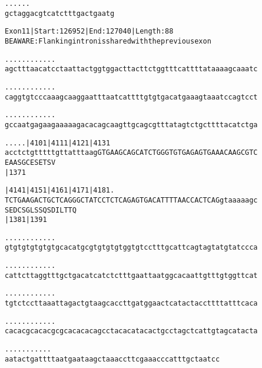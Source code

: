 \documentclass{article}
\begin{document}
\newpage
\begin{alltt}
.    .    .    .    .    .
gctaggacgtcatctttgactgaatg
\end{alltt}
\newpage
\begin{alltt}
Exon 11 | Start: 126952 | End: 127040 | Length: 88
BE AWARE: Flanking intron is shared with the previous exon

.    .    .    .    .    .    .    .    .    .    .    .    
agctttaacatcctaattactggtggacttacttctggtttcattttataaaagcaaatc

.    .    .    .    .    .    .    .    .    .    .    .    
caggtgtcccaaagcaaggaatttaatcattttgtgtgacatgaaagtaaatccagtcct

.    .    .    .    .    .    .    .    .    .    .    .    
gccaatgagaagaaaaagacacagcaagttgcagcgtttatagtctgcttttacatctga

.    .    .    .    .     |4101     |4111     |4121     |4131
acctctgtttttgttatttaagGTGAAGCAGCATCTGGGTGTGAGAGTGAAACAAGCGTC
                        E  A  A  S  G  C  E  S  E  T  S  V  
                                    |1371                   

      |4141     |4151     |4161     |4171     |4181    .    
TCTGAAGACTGCTCAGGGCTATCCTCTCAGAGTGACATTTTAACCACTCAGgtaaaaagc
S  E  D  C  S  G  L  S  S  Q  S  D  I  L  T  T  Q           
      |1381                         |1391                   

.    .    .    .    .    .    .    .    .    .    .    .    
gtgtgtgtgtgtgcacatgcgtgtgtgtggtgtcctttgcattcagtagtatgtatccca

.    .    .    .    .    .    .    .    .    .    .    .    
cattcttaggtttgctgacatcatctctttgaattaatggcacaattgtttgtggttcat

.    .    .    .    .    .    .    .    .    .    .    .    
tgtctccttaaattagactgtaagcaccttgatggaactcatactaccttttatttcaca

.    .    .    .    .    .    .    .    .    .    .    .    
cacacgcacacgcgcacacacagcctacacatacactgcctagctcattgtagcatacta

.    .    .    .    .    .    .    .    .    .    .
aatactgattttaatgaataagctaaaccttcgaaacccatttgctaatcc
\end{alltt}
\newpage
\end{document}
